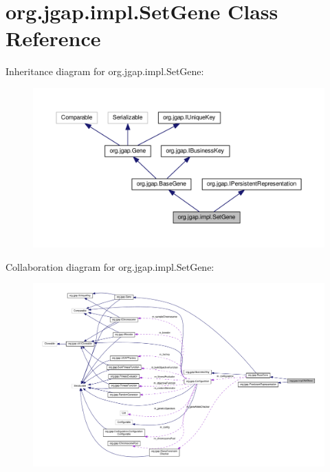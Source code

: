 \hypertarget{classorg_1_1jgap_1_1impl_1_1_set_gene}{\section{org.\-jgap.\-impl.\-Set\-Gene Class Reference}
\label{classorg_1_1jgap_1_1impl_1_1_set_gene}
}


Inheritance diagram for org.\-jgap.\-impl.\-Set\-Gene\-:
\nopagebreak
\begin{figure}[H]
\begin{center}
\leavevmode
\includegraphics[width=350pt]{classorg_1_1jgap_1_1impl_1_1_set_gene__inherit__graph}
\end{center}
\end{figure}


Collaboration diagram for org.\-jgap.\-impl.\-Set\-Gene\-:
\nopagebreak
\begin{figure}[H]
\begin{center}
\leavevmode
\includegraphics[width=350pt]{classorg_1_1jgap_1_1impl_1_1_set_gene__coll__graph}
\end{center}
\end{figure}
